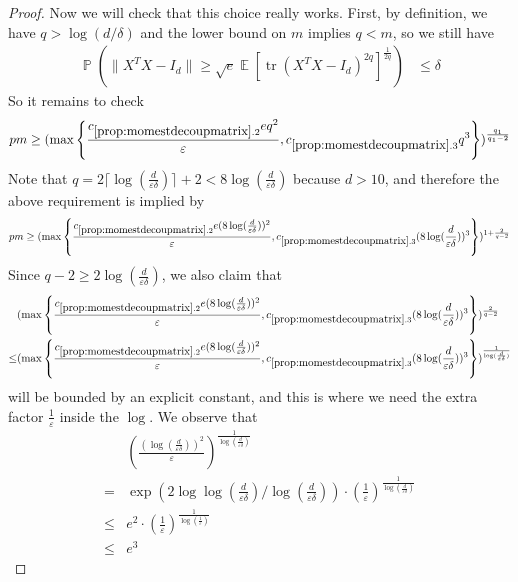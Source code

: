 \documentclass[11pt]{amsart}
\numberwithin{equation}{section}
\numberwithin{equation}{section}
\DeclareMathOperator{\E}{\mathbb{E}}
\DeclareMathOperator{\Pb}{\mathbb{P}}
\DeclareMathOperator*{\tr}{tr}
\theoremstyle{remark}
\theoremstyle{definition}
\begin{document}
\begin{proof}
Now we will check that this choice really works. First, by definition, we have $q> \log (d/\delta)$ and the lower bound on $m$ implies $q<m$, so we still have
\begin{align*}
        \Pb \left( \| X^TX - I_d \| \ge \sqrt{e} \E [ \tr (X^TX - I_d)^{2q}]^\frac{1}{2q} \right) &\le \delta
    \end{align*}
So it remains to check 
\begin{align*}pm \ge (\max \left\{ \frac{c_{\ref*{prop:momestdecoupmatrix}.2}{e} q^2}{ \varepsilon}, c_{\ref*{prop:momestdecoupmatrix}.3} q^3 \right\})^{\frac{q_1}{q_1-2}}\end{align*}
Note that $q=2\lceil \log (\frac{d}{\varepsilon \delta})\rceil+2<8\log (\frac{d}{\varepsilon \delta})$ because $d>10$, and therefore the above requirement is implied by
\begin{align*}pm \ge (\max \left\{ \frac{c_{\ref*{prop:momestdecoupmatrix}.2}{e} (8\log(\frac{d}{\varepsilon \delta}))^2}{ \varepsilon}, c_{\ref*{prop:momestdecoupmatrix}.3} (8\log(\frac{d}{\varepsilon \delta}))^3 \right\})^{1+\frac{2}{q-2}}  \end{align*}
Since $q-2 \ge 2\log (\frac{d}{\varepsilon \delta})$, we also claim that
\begin{align*}
    &(\max \left\{ \frac{c_{\ref*{prop:momestdecoupmatrix}.2}{e} (8\log(\frac{d}{\varepsilon \delta}))^2}{ \varepsilon}, c_{\ref*{prop:momestdecoupmatrix}.3} (8\log(\frac{d}{\varepsilon \delta}))^3 \right\})^{\frac{2}{q-2}} \\\le& (\max \left\{ \frac{c_{\ref*{prop:momestdecoupmatrix}.2}{e} (8\log(\frac{d}{\varepsilon \delta}))^2}{ \varepsilon}, c_{\ref*{prop:momestdecoupmatrix}.3} (8\log(\frac{d}{\varepsilon \delta}))^3 \right\})^{\frac{1}{\log (\frac{d}{\varepsilon \delta})}}
\end{align*}
will be bounded by an explicit constant, and this is where we need the extra factor $\frac{1}{\varepsilon}$ inside the $\log$.
We observe that
\begin{align*}
    &(\frac{ (\log(\frac{d}{\varepsilon \delta}))^2}{ \varepsilon})^{\frac{1}{\log (\frac{d}{\varepsilon \delta})}}
    \\ = & \exp(2\log\log(\frac{d}{\varepsilon \delta})/\log (\frac{d}{\varepsilon \delta}))\cdot (\frac{1}{\varepsilon})^{\frac{1}{\log (\frac{d}{\varepsilon \delta})}}
    \\ \le & e^2 \cdot (\frac{1}{\varepsilon})^{\frac{1}{\log (\frac{1}{\varepsilon})}}
    \\\le & e^3
\end{align*}

\end{proof}
\end{document}

